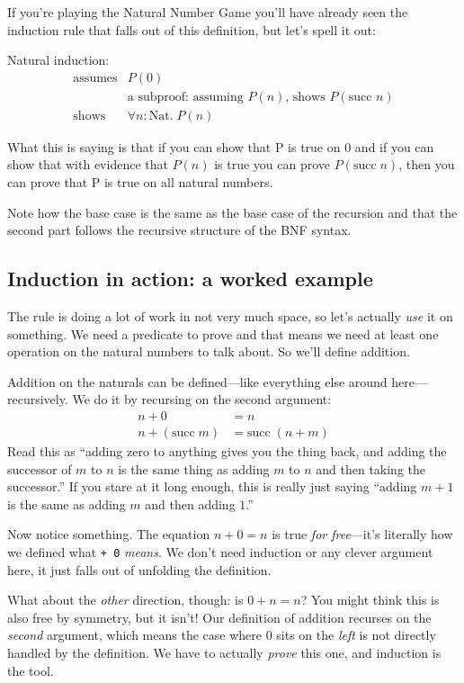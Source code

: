 \documentclass[11pt]{article}
\begin{document}
If you're playing the Natural Number Game you'll have already seen the induction rule that falls out of this definition, but let's spell it out:

Natural induction:
\[
  \begin{array}{rl}
    \text{assumes} & P(0) \\
                   & \text{a subproof: assuming $P(n)$, shows $P(\text{succ } n)$} \\
    \hline
    \text{shows} & \forall n : \text{Nat}.\; P(n)
  \end{array}
\]

What this is saying is that if you can show that P is true on 0 and if you can show that with evidence that $P(n)$ is true you can prove $P(\text{succ}\; n)$, then you can prove that P is true on all natural numbers.

Note how the base case is the same as the base case of the recursion and that the second part follows the recursive structure of the BNF syntax.

\subsection{Induction in action: a worked example}
The rule is doing a lot of work in not very much space, so let's actually \emph{use} it on something. We need a predicate to prove and that means we need at least one operation on the natural numbers to talk about. So we'll define addition.

Addition on the naturals can be defined---like everything else around here---recursively. We do it by recursing on the second argument:
\begin{align*}
n + 0 &= n \\
n + (\text{succ}\; m) &= \text{succ}\;(n + m)
\end{align*}
Read this as ``adding zero to anything gives you the thing back, and adding the successor of $m$ to $n$ is the same thing as adding $m$ to $n$ and then taking the successor.'' If you stare at it long enough, this is really just saying ``adding $m+1$ is the same as adding $m$ and then adding $1$.''

Now notice something. The equation $n + 0 = n$ is true \emph{for free}---it's literally how we defined what \texttt{+ 0} \emph{means}. We don't need induction or any clever argument here, it just falls out of unfolding the definition.

What about the \emph{other} direction, though: is $0 + n = n$? You might think this is also free by symmetry, but it isn't! Our definition of addition recurses on the \emph{second} argument, which means the case where $0$ sits on the \emph{left} is not directly handled by the definition. We have to actually \emph{prove} this one, and induction is the tool.
\end{document}
